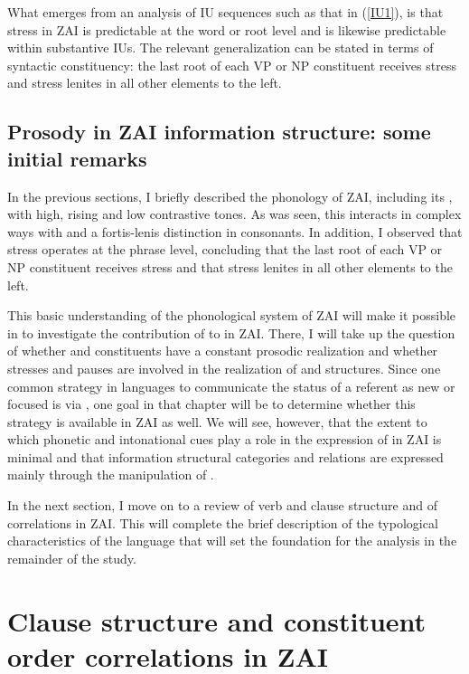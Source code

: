 What emerges from an analysis of IU sequences such as that in (\ref{IU1}), is that stress in ZAI is predictable at the word or root level and is likewise predictable within substantive IUs. The relevant generalization can be stated in terms of syntactic constituency: the last root of each VP or NP constituent receives stress and stress lenites in all other elements to the left. 


\subsection{Prosody in ZAI information structure: some initial remarks}\label{prosodyis}

In the previous sections, I briefly described the phonology of ZAI, including its , with high, rising and low contrastive tones. As was seen, this  interacts in complex ways with  and a fortis-lenis distinction in consonants. In addition, I observed that stress operates at the phrase level, concluding that the last root of each VP or NP constituent receives stress and that stress lenites in all other elements to the left. 

This basic understanding of the phonological system of ZAI will make it possible in  to investigate the contribution of  to  in ZAI. There, I will take up the question of whether  and  constituents have a constant prosodic realization and whether stresses and pauses are involved in the realization of  and  structures. Since one common strategy in languages to communicate the status of a referent as new or focused is via , one goal in that chapter will be to determine whether this strategy is available in ZAI as well. We will see, however, that the extent to which phonetic and intonational cues play a role in the expression of  in ZAI is minimal and that information structural categories and relations are expressed mainly through the manipulation of .

\newpage 
In the next section, I move on to a review of verb and clause structure and of  correlations in ZAI. This will complete the brief description of the typological characteristics of the language that will set the foundation for the analysis in the remainder of the study.


\section{Clause structure and constituent order correlations in ZAI}\label{wordorder}


